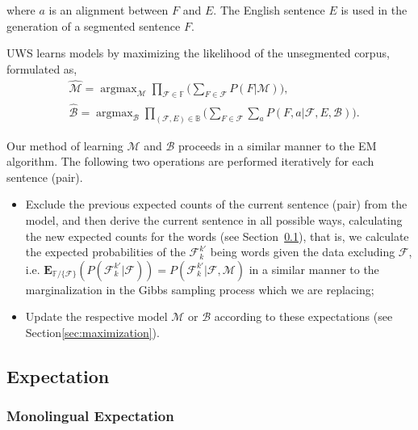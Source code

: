 \documentclass[11pt]{article}
\begin{document}
where $a$ is an alignment between $F$ and $E$. The English sentence $E$
is used in the generation of a segmented sentence $F$.


UWS learns models by maximizing the likelihood of the unsegmented corpus, formulated as,
\begin{align}
&\hat{\mathcal{M}}=\mathop{\mathrm{argmax}}_\mathcal{M} \prod_{\mathcal{F} \in \mathbb{F} } \Big( \sum_{F \in \mathcal{F} } P(F|\mathcal{M}) \Big), \label{eq:model:monoling}  \\
&\hat{\mathcal{B}}=\mathop{\mathrm{argmax}}_\mathcal{B} \prod_{(\mathcal{F},E) \in \mathbb{B} } \Big( \sum_{F \in \mathcal{F} } \sum_a P(F,a|\mathcal{F},E,\mathcal{B})\Big). \label{eq:model:biling}  
\end{align}

Our method of learning $\mathcal{M}$ and $\mathcal{B}$ proceeds in a similar manner to the
EM algorithm. The following two operations are performed iteratively for
each sentence (pair).

\begin{itemize}

\item Exclude the previous expected counts of the current sentence (pair) from the model, and then derive the current sentence in all possible ways, calculating the new expected counts for the words (see Section~\ref{sec:expectation}), that is, we calculate the expected probabilities of the $\mathcal{F}_k^{k'}$ being words given the data excluding $\mathcal{F}$, i.e. $\mathbf{E}_{\mathbb{F}/\{\mathcal{F}\}}( P(\mathcal{F}_k^{k'}|\mathcal{F}))= P(\mathcal{F}_k^{k'}|\mathcal{F},\mathcal{M})$ in a similar manner
to the marginalization in the Gibbs sampling process which we are replacing;

\item Update the respective model $\mathcal{M}$ or $\mathcal{B}$ according to these expectations (see Section\ref{sec:maximization}).

\end{itemize}

\subsection{Expectation}
\label{sec:expectation}
\subsubsection{Monolingual Expectation}
\end{document}

